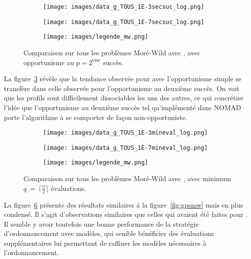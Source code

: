 \begin{figure}[!htb]
	\centering
	\begin{subfigure}{0.43\textwidth}
		\texttt{[image: images/data\_g\_TOUS\_1E-3secsuc\_log.png]}
		\label{fig:data_g_TOUS_1E-3secsuc_log}
	\end{subfigure}%
	\begin{subfigure}{0.43\textwidth}
		\texttt{[image: images/data\_g\_TOUS\_1E-7secsuc\_log.png]}
		\label{fig:data_g_TOUS_1E-7secsuc_log}
	\end{subfigure}
	\smallskip
	\begin{subfigure}{0.95\textwidth}
		\texttt{[image: images/legende\_mw.png]}
	\end{subfigure}
	\caption{Comparaison sur tous les problèmes Moré-Wild avec \GPS, avec opportunisme au $p=2^{\text{ème}}$ succès.}
	\label{fig:gpsmwsecsuc}
\end{figure}

La figure~\ref{fig:gpsmwsecsuc} révèle que la tendance observée pour \GPS avec l'opportunisme simple se transfère dans celle observée pour l'opportunisme au deuxième succès. On voit que les profils sont difficilement dissociables les uns des autres, ce qui concrétise l'idée que l'opportunisme au deuxième succès tel qu'implémenté dans NOMAD porte l'algorithme à se comporter de façon non-opportuniste.

\begin{figure}[!htb]
	\centering
	\begin{subfigure}{0.43\textwidth}
		\texttt{[image: images/data\_g\_TOUS\_1E-3mineval\_log.png]}
		\label{fig:data_g_TOUS_1E-3mineval_log}
	\end{subfigure}%
	\begin{subfigure}{0.43\textwidth}
		\texttt{[image: images/data\_g\_TOUS\_1E-7mineval\_log.png]}
		\label{fig:data_g_TOUS_1E-7mineval_log}
	\end{subfigure}
	\smallskip
	\begin{subfigure}{0.95\textwidth}
		\texttt{[image: images/legende\_mw.png]}
	\end{subfigure}
	\caption{Comparaison sur tous les problèmes Moré-Wild avec \GPS, avec minimum $q~=~\lceil\frac{n}{2}\rceil$ évaluations.} 
	\label{fig:gps_mw_mineval}
\end{figure} 

La figure~\ref{fig:gps_mw_mineval} présente des résultats similaires à la figure~\ref{fig:gpsmw} mais en plus condensé. Il s'agit d'observations similaires que celles qui avaient été faites pour \CS. Il semble y avoir toutefois une bonne performance de la stratégie d'ordonnancement avec modèles, qui semble bénéficier des évaluations supplémentaires lui permettant de raffiner les modèles nécessaires à l'ordonnancement.

